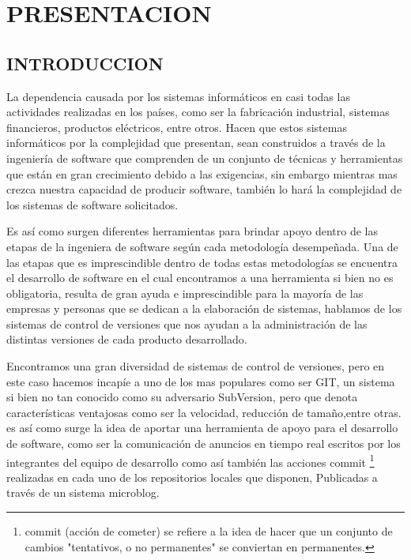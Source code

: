

%
\chapter{PRESENTACION}
\section{INTRODUCCION}
La dependencia causada por los sistemas informáticos en casi todas las actividades realizadas en los países, como ser la fabricación industrial, sistemas financieros, productos eléctricos, entre otros.
Hacen que estos sistemas informáticos por la complejidad que presentan, sean construidos a través de la ingeniería de software que comprenden de un conjunto de técnicas y herramientas que están en gran crecimiento debido a las exigencias, sin embargo mientras mas crezca nuestra capacidad de producir software, también lo hará la complejidad de los sistemas de software solicitados.

Es así como surgen diferentes herramientas para brindar apoyo dentro de las etapas de la ingeniera de software según cada metodología desempeñada. Una de las etapas que es imprescindible dentro de todas estas metodologías se encuentra el desarrollo de software en el cual encontramos a una herramienta si bien no es obligatoria, resulta de gran ayuda e imprescindible para la mayoría de las empresas y personas que se dedican a la elaboración de sistemas, hablamos de los sistemas de control de versiones que nos ayudan a la administración de las distintas versiones de cada producto desarrollado.

Encontramos una gran diversidad de sistemas de control de versiones, pero en este caso hacemos incapíe a uno de los mas populares como ser GIT, un sistema si bien no tan conocido como su adversario SubVersion, pero que denota características ventajosas como ser la velocidad, reducción de tamaño,entre otras. es así como surge la idea de aportar una herramienta de apoyo para el desarrollo de software, como ser la comunicación de anuncios en tiempo real escritos por los integrantes del equipo de desarrollo como así también las acciones commit \footnote{commit (acción de cometer) se refiere a la idea de hacer que un conjunto de cambios "tentativos, o no permanentes" se conviertan en permanentes.} realizadas en cada uno de los repositorios locales que disponen, Publicadas a través de un sistema microblog.


